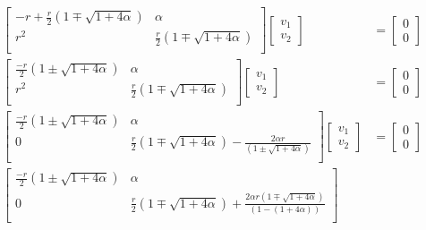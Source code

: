 \documentclass{article}
\begin{document}
\begin{align*}
\begin{bmatrix}
-r + \frac{r}{2}\left( 1 \mp \sqrt{1 + 4\alpha} \right)	&	\alpha		\\
r^{2}														&	\frac{r}{2}\left( 1 \mp \sqrt{1 + 4\alpha} \right)	\\
\end{bmatrix}
\begin{bmatrix}
v_{1}\\
v_{2}
\end{bmatrix}
&=
\begin{bmatrix}
0\\
0
\end{bmatrix}
\\
\begin{bmatrix}
\frac{-r}{2}\left( 1 \pm \sqrt{1 + 4\alpha} \right)	&	\alpha		\\
r^{2}												&	\frac{r}{2}\left( 1 \mp \sqrt{1 + 4\alpha} \right)	\\
\end{bmatrix}
\begin{bmatrix}
v_{1}\\
v_{2}
\end{bmatrix}
&=
\begin{bmatrix}
0\\
0
\end{bmatrix}
\\
\begin{bmatrix}
\frac{-r}{2}\left( 1 \pm \sqrt{1 + 4\alpha} \right)	&	\alpha		\\
0												&	\frac{r}{2}\left( 1 \mp \sqrt{1 + 4\alpha} \right) - \frac{2\alpha r}{\left( 1 \pm \sqrt{1 + 4\alpha} \right)}	\\
\end{bmatrix}
\begin{bmatrix}
v_{1}\\
v_{2}
\end{bmatrix}
&=
\begin{bmatrix}
0\\
0
\end{bmatrix}
\\
\begin{bmatrix}
\frac{-r}{2}\left( 1 \pm \sqrt{1 + 4\alpha} \right)	&	\alpha		\\
0	&	\frac{r}{2}\left( 1 \mp \sqrt{1 + 4\alpha} \right) + \frac{2\alpha r \left( 1 \mp \sqrt{1 + 4\alpha} \right) }{\left( 1 - (1 + 4\alpha) \right)}	\\
\end{bmatrix}

\end{align*}
\end{document}

